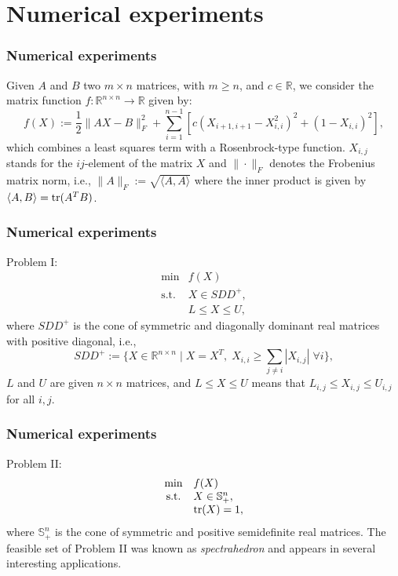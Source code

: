 \section{Numerical experiments}

\begin{frame}[t]\frametitle{Numerical experiments}
  Given $A$ and $B$ two $m\times n$ matrices, with $m\geq n$, and $c\in\mathbb{R}$, we consider the matrix function $f:\mathbb{R}^{n\times n}\to\mathbb{R}$ given by:
$$f(X):=\dfrac{1}{2}\|AX-B\|^2_F + \sum_{i=1}^{n-1} \left[ c \left( X_{i+1,i+1}-X_{i,i}^2 \right)^2 + (1-X_{i,i})^2   \right],$$
which combines a least squares term with a Rosenbrock-type function. $X_{i,j}$ stands for the $ij$-element of the matrix $X$ and $\|\cdot\|_F$ denotes the Frobenius matrix norm, i.e., $\|A\|_F:=\sqrt{\langle A,A \rangle}$ where the inner product is given by $\langle A,B \rangle = \textrm{tr}(A^TB)$. 
\end{frame}


\begin{frame}[t]\frametitle{Numerical experiments}
  \begin{block}{Problem I:}
    \begin{equation*} 
      \begin{array}{cl}
        \displaystyle\min     & f(X)           \\
        \mbox{s.t.} & X \in SDD^+,   \\
                    & L\leq X\leq U,
      \end{array}
    \end{equation*}
      where $SDD^+$ is the cone of symmetric and diagonally dominant real matrices with positive diagonal, i.e., 
      \[
        SDD^+ :=\{X\in\mathbb{R}^{n\times n}\mid X=X^T, \; X_{i,i}\geq \displaystyle\sum_{j\neq i}|X_{i,j}| \; \forall i\},
      \]
     $L$ and $U$ are given $n\times n$ matrices, and  $L\leq X\leq U$ means that $L_{i,j} \leq X_{i,j} \leq U_{i,j}$ for all $i,j$.
\end{block}

\end{frame}


\begin{frame}[t]\frametitle{Numerical experiments}
  \begin{block}{Problem II:}
    \begin{equation*}
      \begin{array}{cl}
        \displaystyle\min   & f(X)                  \\
        \mbox{s.t.}         & X \in \mathbb{S}^n_+, \\
                            & \textrm{tr}(X)=1,
      \end{array}
    \end{equation*}
    where $\mathbb{S}^n_+$ is the cone of symmetric and positive semidefinite real matrices. The feasible set of Problem II was known as {\it spectrahedron} and appears in several interesting applications.
  \end{block}
\end{frame}


